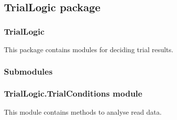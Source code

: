 \documentclass[letterpaper,10pt,english]{sphinxmanual}
\begin{document}
\sphinxstepscope


\subsection{TrialLogic package}
\label{\detokenize{NoSeMazeControl/TrialLogic:triallogic-package}}\label{\detokenize{NoSeMazeControl/TrialLogic::doc}}

\subsubsection{TrialLogic}
\label{\detokenize{NoSeMazeControl/TrialLogic:triallogic}}
\sphinxAtStartPar
This package contains modules for deciding trial results.


\subsubsection{Submodules}
\label{\detokenize{NoSeMazeControl/TrialLogic:submodules}}

\subsubsection{TrialLogic.TrialConditions module}
\label{\detokenize{NoSeMazeControl/TrialLogic:module-TrialLogic.TrialConditions}}\label{\detokenize{NoSeMazeControl/TrialLogic:triallogic-trialconditions-module}}
\sphinxAtStartPar
This module contains methods to analyse read data.
\end{document}
